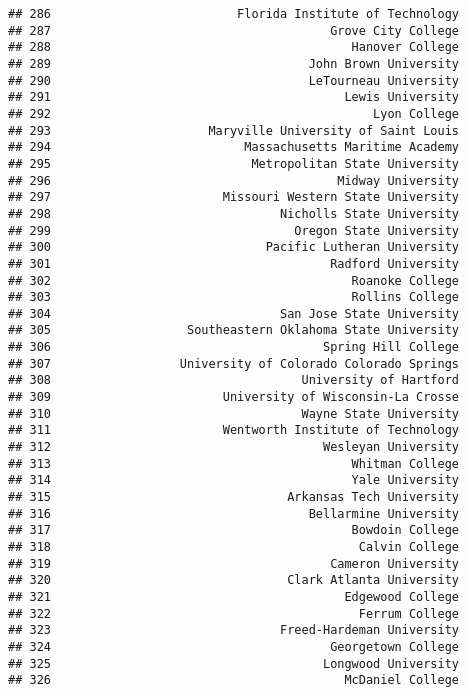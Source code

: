 \documentclass[
]{article}
\begin{document}
\begin{verbatim}
## 286                          Florida Institute of Technology
## 287                                       Grove City College
## 288                                          Hanover College
## 289                                    John Brown University
## 290                                    LeTourneau University
## 291                                         Lewis University
## 292                                             Lyon College
## 293                      Maryville University of Saint Louis
## 294                           Massachusetts Maritime Academy
## 295                            Metropolitan State University
## 296                                        Midway University
## 297                        Missouri Western State University
## 298                                Nicholls State University
## 299                                  Oregon State University
## 300                              Pacific Lutheran University
## 301                                       Radford University
## 302                                          Roanoke College
## 303                                          Rollins College
## 304                                San Jose State University
## 305                   Southeastern Oklahoma State University
## 306                                      Spring Hill College
## 307                  University of Colorado Colorado Springs
## 308                                   University of Hartford
## 309                        University of Wisconsin-La Crosse
## 310                                   Wayne State University
## 311                        Wentworth Institute of Technology
## 312                                      Wesleyan University
## 313                                          Whitman College
## 314                                          Yale University
## 315                                 Arkansas Tech University
## 316                                    Bellarmine University
## 317                                          Bowdoin College
## 318                                           Calvin College
## 319                                       Cameron University
## 320                                 Clark Atlanta University
## 321                                         Edgewood College
## 322                                           Ferrum College
## 323                                Freed-Hardeman University
## 324                                       Georgetown College
## 325                                      Longwood University
## 326                                         McDaniel College

\end{verbatim}
\end{document}
